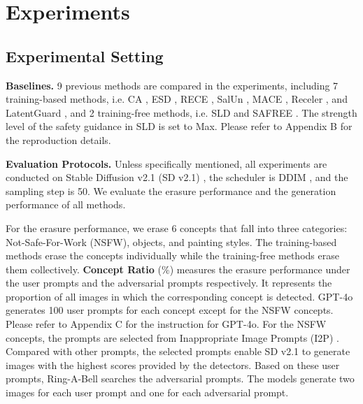 \section{Experiments}
\label{sec: experiments}



\subsection{Experimental Setting}
\label{sec: setting}

\textbf{Baselines.} 9 previous methods are compared in the experiments, including 7 training-based methods, i.e. CA \cite{kumari2023ablating}, ESD \cite{gandikota2023erasing}, RECE \cite{gong2024reliable}, SalUn \cite{fan2023salun}, MACE \cite{lu2024mace}, Receler \cite{huang2023receler}, and LatentGuard \cite{liu2025latent}, and 2 training-free methods, i.e. SLD \cite{schramowski2023safe} and SAFREE \cite{yoon2024safree}. The strength level of the safety guidance in SLD is set to Max. Please refer to Appendix B for the reproduction details.

\textbf{Evaluation Protocols.} Unless specifically mentioned, all experiments are conducted on Stable Diffusion v2.1 (SD v2.1) \cite{rombach2022high}, the scheduler is DDIM \cite{songdenoising}, and the sampling step is 50. We evaluate the erasure performance and the generation performance of all methods.

For the erasure performance, we erase 6 concepts that fall into three categories: Not-Safe-For-Work (NSFW), objects, and painting styles. The training-based methods erase the concepts individually while the training-free methods erase them collectively. \textbf{Concept Ratio} (\%) measures the erasure performance under the user prompts and the adversarial prompts respectively. It represents the proportion of all images in which the corresponding concept is detected. GPT-4o \cite{achiam2023gpt} generates 100 user prompts for each concept except for the NSFW concepts. Please refer to Appendix C for the instruction for GPT-4o. For the NSFW concepts, the prompts are selected from Inappropriate Image Prompts (I2P) \cite{schramowski2023safe}. Compared with other prompts, the selected prompts enable SD v2.1 to generate images with the highest scores provided by the detectors. Based on these user prompts, Ring-A-Bell \cite{tsai2023ring} searches the adversarial prompts. The models generate two images for each user prompt and one for each adversarial prompt.


